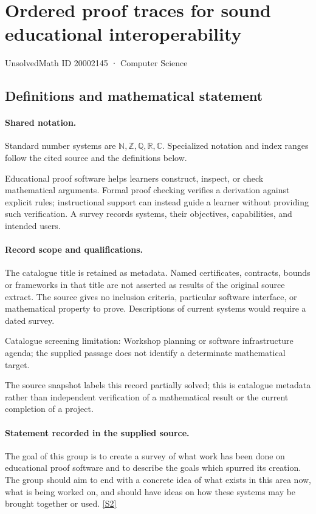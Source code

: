 \documentclass[11pt]{article}
\newcommand{\sref}[2]{\hyperlink{source:#1:#2}{[S#2]}}
\begin{document}
\setcounter{section}{20002144}
\section{Ordered proof traces for sound educational interoperability}\label{20002145}
{\small\sffamily UnsolvedMath ID 20002145 · Computer Science}
\subsection{Definitions and mathematical statement}

\paragraph{Shared notation.}Standard number systems are $\mathbb N,\mathbb Z,\mathbb Q,\mathbb R,\mathbb C$. Specialized notation and index ranges follow the cited source and the definitions below.


Educational proof software helps learners construct, inspect, or check mathematical arguments. Formal proof checking verifies a derivation against explicit rules; instructional support can instead guide a learner without providing such verification. A survey records systems, their objectives, capabilities, and intended users.
\paragraph{Record scope and qualifications.}
The catalogue title is retained as metadata. Named certificates, contracts, bounds or frameworks in that title are not asserted as results of the original source extract.
The source gives no inclusion criteria, particular software interface, or mathematical property to prove. Descriptions of current systems would require a dated survey.

Catalogue screening limitation: Workshop planning or software infrastructure agenda; the supplied passage does not identify a determinate mathematical target.

The source snapshot labels this record partially solved; this is catalogue metadata rather than independent verification of a mathematical result or the current completion of a project.
\paragraph{Statement recorded in the supplied source.}
The goal of this group is to create a survey of what work has been done on educational proof software and to describe the goals which spurred its creation. The group should aim to end with a concrete idea of what exists in this area now, what is being worked on, and should have ideas on how these systems may be brought together or used. \sref{20002145}{2}
\end{document}
